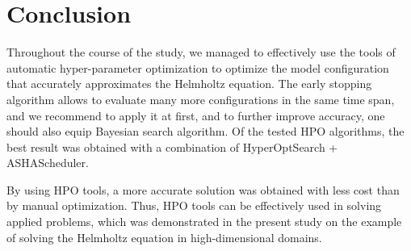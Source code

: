 \documentclass[reprint,
superscriptaddress,
amsmath,amssymb,aps,showkeys,showpacs,
twoside,final,secnumarabic,%
nofootinbib]{revtex4-2}
\begin{document}
\section{Conclusion}
Throughout the course of the study, we managed to effectively use the tools of automatic hyper-parameter optimization to optimize the model configuration that accurately approximates the Helmholtz equation. The early stopping algorithm allows to evaluate many more configurations in the same time span, and we recommend to apply it at first, and to further improve accuracy, one should also equip Bayesian search algorithm. Of the tested HPO algorithms, the best result was obtained with a combination of HyperOptSearch + ASHAScheduler.

By using HPO tools, a more accurate solution was obtained with less cost than by manual optimization. Thus, HPO tools can be effectively used in solving applied problems, which was demonstrated in the present study on the example of solving the Helmholtz equation in high-dimensional domains.
\end{document}
